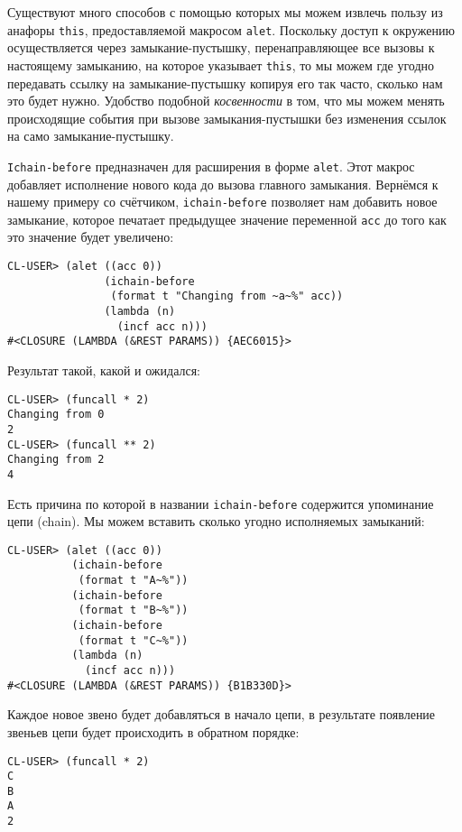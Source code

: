 Существуют много способов с помощью которых мы можем извлечь пользу из анафоры \verb"this", предоставляемой макросом \verb"alet". Поскольку доступ к окружению осуществляется через замыкание-пустышку, перенаправляющее все вызовы к настоящему замыканию, на которое указывает \verb"this", то мы можем где угодно передавать ссылку на замыкание-пустышку копируя его так часто, сколько нам это будет нужно. Удобство подобной \emph{косвенности} в том, что мы можем менять происходящие события при вызове замыкания-пустышки без изменения ссылок на само замыкание-пустышку.

\verb"Ichain-before" предназначен для расширения в форме \verb"alet". Этот макрос добавляет исполнение нового кода до вызова главного замыкания. Вернёмся к нашему примеру со счётчиком, \verb"ichain-before" позволяет нам добавить новое замыкание, которое печатает предыдущее значение переменной \verb"acc" до того как это значение будет увеличено:

\begin{verbatim}
CL-USER> (alet ((acc 0))
               (ichain-before
                (format t "Changing from ~a~%" acc))
               (lambda (n)
                 (incf acc n)))
#<CLOSURE (LAMBDA (&REST PARAMS)) {AEC6015}>
\end{verbatim}

Результат такой, какой и ожидался:

\begin{verbatim}
CL-USER> (funcall * 2)
Changing from 0
2
CL-USER> (funcall ** 2)
Changing from 2
4
\end{verbatim}

Есть причина по которой в названии \verb"ichain-before" содержится упоминание цепи (chain). Мы можем вставить сколько угодно исполняемых замыканий:

\begin{verbatim}
CL-USER> (alet ((acc 0))
          (ichain-before
           (format t "A~%"))
          (ichain-before
           (format t "B~%"))
          (ichain-before
           (format t "C~%"))
          (lambda (n)
            (incf acc n)))
#<CLOSURE (LAMBDA (&REST PARAMS)) {B1B330D}>
\end{verbatim}

Каждое новое звено будет добавляться в начало цепи, в результате появление звеньев цепи будет происходить в обратном порядке:

\begin{verbatim}
CL-USER> (funcall * 2)
C
B
A
2
\end{verbatim}


